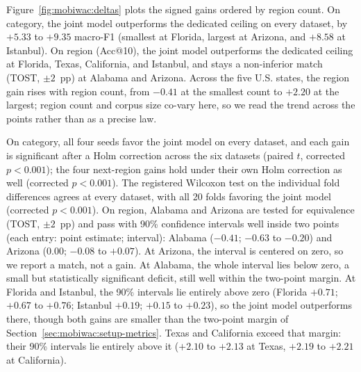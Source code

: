 Figure~\ref{fig:mobiwac:deltas} plots the signed gains ordered by region count. On
category, the joint model outperforms the dedicated ceiling on
every dataset, by $+5.33$ to $+9.35$ macro-F1 (smallest at Florida, largest at
Arizona, and $+8.58$ at Istanbul).
On region (Acc@10), the joint model outperforms the dedicated ceiling at
Florida, Texas, California, and Istanbul, and stays a non-inferior match
(TOST, $\pm2$~pp) at Alabama and Arizona. Across the five U.S. states, the region gain rises with region count,
from $-0.41$ at the smallest count to $+2.20$ at the largest; region count and
corpus size co-vary here, so we read the trend across the points rather than
as a precise law.

On category, all four
seeds favor the joint model on every dataset, and each gain is significant
after a Holm correction across the six datasets (paired $t$, corrected
$p<0.001$); the four next-region gains hold under their own Holm correction as
well (corrected $p<0.001$). The registered Wilcoxon test on the individual fold
differences agrees at every dataset, with all 20 folds favoring the joint model
(corrected $p<0.001$). On region, Alabama and Arizona are tested for equivalence (TOST,
$\pm2$~pp) and pass with 90\% confidence intervals well inside two points
(each entry: point estimate; interval): Alabama ($-0.41$; $-0.63$ to $-0.20$)
and Arizona ($0.00$; $-0.08$ to $+0.07$). At Arizona, the interval is centered on zero, so we report a match,
not a gain. At Alabama, the whole interval lies below zero, a small but
statistically significant deficit, still well within the two-point margin. At
Florida and Istanbul, the 90\% intervals lie entirely above zero (Florida
$+0.71$; $+0.67$ to $+0.76$; Istanbul $+0.19$; $+0.15$ to $+0.23$), so the
joint model outperforms there, though both gains are smaller than the
two-point margin of Section~\ref{sec:mobiwac:setup-metrics}. Texas and California
exceed that margin: their 90\% intervals lie entirely above it ($+2.10$ to
$+2.13$ at Texas, $+2.19$ to $+2.21$ at California).


